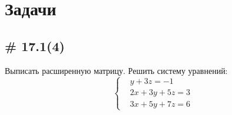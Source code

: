 \documentclass[a4paper,12pt]{article}
\begin{document}
  
  \section{Задачи}
  
  \subsection{\# 17.1(4)}
  
  Выписать расширенную матрицу.
  Решить систему уравнений:
  \[
    \left\{
    \begin{aligned}
      &y + 3z = -1\\
      &2x + 3y + 5z = 3\\
      &3x + 5y + 7z = 6
    \end{aligned}
    \right.
  \]

\end{document}
